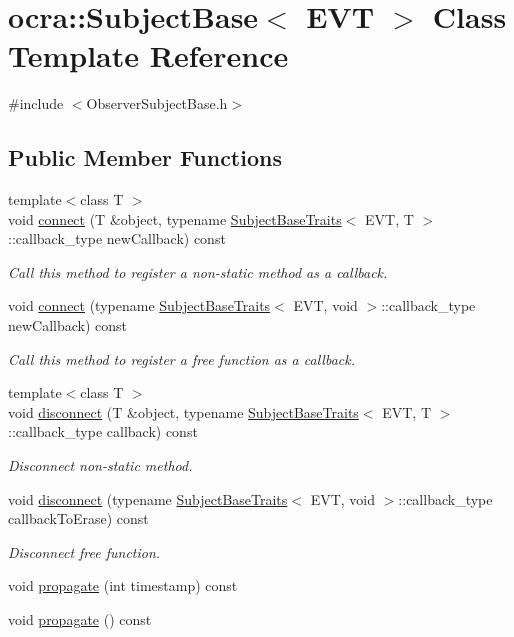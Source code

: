 \hypertarget{classocra_1_1SubjectBase}{}\section{ocra\+:\+:Subject\+Base$<$ E\+VT $>$ Class Template Reference}
\label{classocra_1_1SubjectBase}


{\ttfamily \#include $<$Observer\+Subject\+Base.\+h$>$}

\subsection*{Public Member Functions}
\begin{DoxyCompactItemize}
\item 
{\footnotesize template$<$class T $>$ }\\void \hyperlink{classocra_1_1SubjectBase_a865ef717bcaa09cde87c54e2794b50c9}{connect} (T \&object, typename \hyperlink{structocra_1_1SubjectBaseTraits}{Subject\+Base\+Traits}$<$ E\+VT, T $>$\+::callback\+\_\+type new\+Callback) const 
\begin{DoxyCompactList}\small\item\em Call this method to register a non-\/static method as a callback. \end{DoxyCompactList}\item 
void \hyperlink{classocra_1_1SubjectBase_a3e4fd829039b47fac106546f0c9d4601}{connect} (typename \hyperlink{structocra_1_1SubjectBaseTraits}{Subject\+Base\+Traits}$<$ E\+VT, void $>$\+::callback\+\_\+type new\+Callback) const 
\begin{DoxyCompactList}\small\item\em Call this method to register a free function as a callback. \end{DoxyCompactList}\item 
{\footnotesize template$<$class T $>$ }\\void \hyperlink{classocra_1_1SubjectBase_a5278926fce35e0837bb02cb9c078794a}{disconnect} (T \&object, typename \hyperlink{structocra_1_1SubjectBaseTraits}{Subject\+Base\+Traits}$<$ E\+VT, T $>$\+::callback\+\_\+type callback) const 
\begin{DoxyCompactList}\small\item\em Disconnect non-\/static method. \end{DoxyCompactList}\item 
void \hyperlink{classocra_1_1SubjectBase_a575c512acd7446af455c0e4dfed9f4d1}{disconnect} (typename \hyperlink{structocra_1_1SubjectBaseTraits}{Subject\+Base\+Traits}$<$ E\+VT, void $>$\+::callback\+\_\+type callback\+To\+Erase) const 
\begin{DoxyCompactList}\small\item\em Disconnect free function. \end{DoxyCompactList}\item 
void \hyperlink{classocra_1_1SubjectBase_afbb5cf4749642702418dc0973caaf807}{propagate} (int timestamp) const 
\item 
void \hyperlink{classocra_1_1SubjectBase_a9a5769f7f17b40bf1564e7028f1b386b}{propagate} () const 
\end{DoxyCompactItemize}
